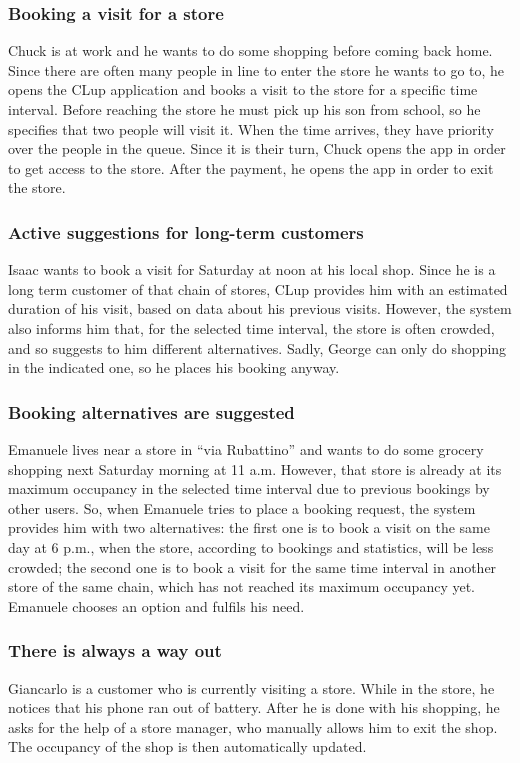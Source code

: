 \documentclass[a4paper,oneside,11pt]{book}   %
\begin{document}
        \subsubsection{Booking a visit for a store}
        Chuck is at work and he wants to do some shopping before coming back home. Since there are often many people in line to enter the store he wants to go to, he opens the CLup application and books a visit to the store for a specific time interval. Before reaching the store he must pick up his son from school, so he specifies that two people will visit it. When the time arrives, they have priority over the people in the queue. Since it is their turn, Chuck opens the app in order to get access to the store. After the payment, he opens the app in order to exit the store.
        \subsubsection{Active suggestions for long-term customers}
        Isaac wants to book a visit for Saturday at noon at his local shop. Since he is a long term customer of that chain of stores, CLup provides him with an estimated duration of his visit, based on data about his previous visits. However, the system also informs him that, for the selected time interval, the store is often crowded, and so suggests to him different alternatives. Sadly, George can only do shopping in the indicated one, so he places his booking anyway.
        \subsubsection{Booking alternatives are suggested}
        Emanuele lives near a store in “via Rubattino” and wants to do some grocery shopping next Saturday morning at 11 a.m. However, that store is already at its maximum occupancy in the selected time interval due to previous bookings by other users. So, when Emanuele tries to place a booking request, the system provides him with two alternatives: the first one is to book a visit on the same day at 6 p.m., when the store, according to bookings and statistics, will be less crowded; the second one is to book a visit for the same time interval in another store of the same chain, which has not reached its maximum occupancy yet. Emanuele chooses an option and fulfils his need. 
        \subsubsection{There is always a way out}
        Giancarlo is a customer who is currently visiting a store. While in the store, he notices that his phone ran out of battery. After he is done with his shopping, he asks for the help of a store manager, who manually allows him to exit the shop. The occupancy of the shop is then automatically updated.
\end{document}
